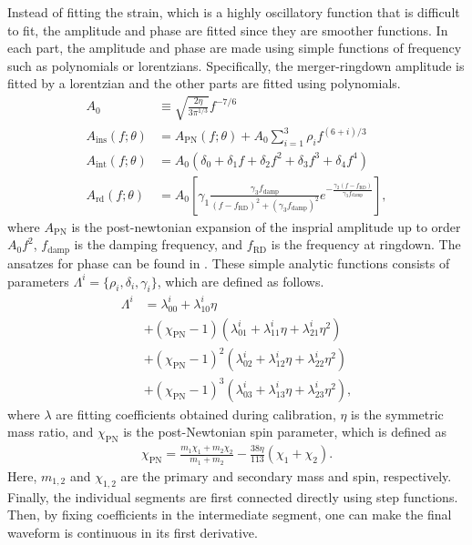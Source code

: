 \documentclass[twocolumn]{aastex631}
\begin{document}
Instead of fitting the strain, which is a highly oscillatory function that is
difficult to fit, the amplitude and phase are fitted since they are smoother
functions. In each part, the amplitude and phase are made using simple functions
of frequency such as polynomials or lorentzians. Specifically, the merger-ringdown amplitude is fitted by a lorentzian and the other parts are fitted using polynomials. 
\begin{equation}\label{eq:amplitude}
\begin{aligned}
	A_0&\equiv\sqrt{\frac{2\eta}{3\pi^{1/3}}}f^{-7/6}\\
	A_{\mathrm{ins}}(f;\theta)&=A_{\mathrm{PN}}(f;\theta)+A_0\sum_{i=1}^3\rho_if^{(6+i)/3} \\
	A_{\mathrm{int}}(f;\theta)&=A_0(\delta_0+\delta_1f+\delta_2f^2+\delta_3f^3+\delta_4f^4) \\
	A_{\mathrm{rd}}(f;\theta)&=A_0\left[\gamma_1\frac{\gamma_3f_{\mathrm{damp}}}{(f-f_{\mathrm{RD}})^2+(\gamma_3f_{\mathrm{damp}})^2}e^{-\frac{\gamma_2(f-f_{\mathrm{RD}})}{\gamma_3f_{\mathrm{damp}}}}\right],  
\end{aligned}
\end{equation}
where $A_{\mathrm{PN}}$ is the post-newtonian expansion of the insprial amplitude up to order $A_0f^2$, $f_{\mathrm{damp}}$ is the damping frequency, and $f_{\mathrm{RD}}$ is the frequency at ringdown. The ansatzes for phase can be found in \citep{khan2016frequency}. These simple analytic functions
consists of parameters $\Lambda^i=\{\rho_i,\delta_i,\gamma_i\}$, which are defined as follows. 
\begin{align} \label{eq:Lambda}
	\Lambda^i&=\lambda_{00}^i+\lambda_{10}^i\eta \nonumber \\
	&+(\chi_{\mathrm{PN}}-1)(\lambda_{01}^i+\lambda_{11}^i\eta+\lambda_{21}^i\eta^2) \nonumber \\ 
	&+(\chi_{\mathrm{PN}}-1)^2(\lambda_{02}^i+\lambda_{12}^i\eta+\lambda_{22}^i\eta^2) \nonumber \\
	&+(\chi_{\mathrm{PN}}-1)^3(\lambda_{03}^i+\lambda_{13}^i\eta+\lambda_{23}^i\eta^2),
\end{align}
where $\lambda$ are fitting coefficients obtained during calibration, $\eta$ is
the symmetric mass ratio, and $\chi_{\mathrm{PN}}$ is the post-Newtonian spin
parameter, which is defined as 
\begin{align}
	\chi_{\mathrm{PN}}=\frac{m_1\chi_1+m_2\chi_2}{m_1+m_2}-\frac{38\eta}{113}(\chi_1+\chi_2).
\end{align}
Here, $m_{1,2}$ and $\chi_{1,2}$ are the primary and secondary mass and spin,
respectively. Finally, the individual segments are first connected directly using 
step functions. Then, by fixing coefficients in the intermediate segment, one can make 
the final waveform is continuous in its first derivative.
\end{document}
